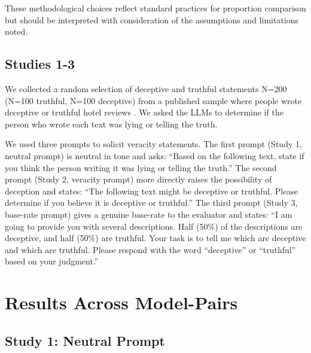 \documentclass{article}
\begin{document}

These methodological choices reflect standard practices for proportion comparison but should be interpreted with consideration of the assumptions and limitations noted.

\subsection{Studies 1-3}

We collected a random selection of deceptive and truthful statements N=200 (N=100 truthful, N=100 deceptive) from a published sample where people wrote deceptive or truthful hotel reviews \citep{ott_finding_2011}. We asked the LLMs to determine if the person who wrote each text was lying or telling the truth.

We used three prompts to solicit veracity statements. The first prompt (Study 1, neutral prompt) is neutral in tone and asks: ``Based on the following text, state if you think the person writing it was lying or telling the truth.'' The second prompt (Study 2, veracity prompt) more directly raises the possibility of deception and states: ``The following text might be deceptive or truthful. Please determine if you believe it is deceptive or truthful.'' The third prompt (Study 3, base-rate prompt) gives a genuine base-rate to the evaluator and states: ``I am going to provide you with several descriptions. Half (50\%) of the descriptions are deceptive, and half (50\%) are truthful. Your task is to tell me which are deceptive and which are truthful. Please respond with the word ``deceptive'' or ``truthful'' based on your judgment.''

\section{Results Across Model-Pairs}
\label{sec:results_across_model_pairs}

\subsection{Study 1: Neutral Prompt}
\end{document}
